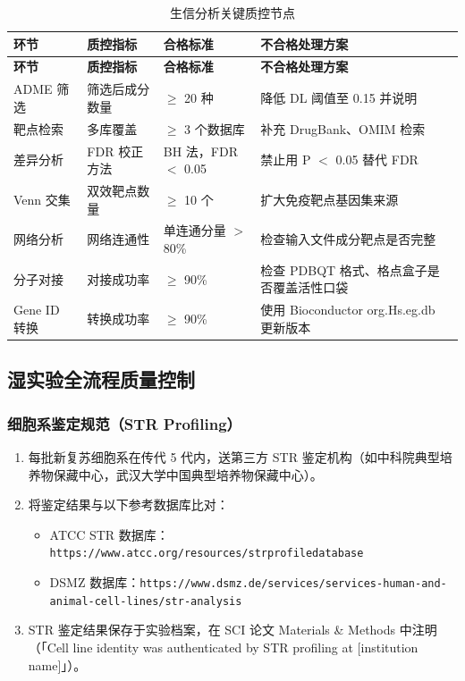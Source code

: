 \documentclass[12pt,a4paper,twoside]{article}
\begin{document}
\begin{longtable}{p{3cm}p{3.5cm}p{2.5cm}p{4.5cm}}
\caption{生信分析关键质控节点} \label{tab:bioinformatics_qc} \\
\toprule
\textbf{环节} & \textbf{质控指标} & \textbf{合格标准} & \textbf{不合格处理方案} \\
\midrule
\endfirsthead
\toprule
\textbf{环节} & \textbf{质控指标} & \textbf{合格标准} & \textbf{不合格处理方案} \\
\midrule
\endhead
\bottomrule
\endlastfoot
ADME 筛选 & 筛选后成分数量 & $\geq$ 20 种 & 降低 DL 阈值至 0.15 并说明 \\
\addlinespace
靶点检索 & 多库覆盖 & $\geq$ 3 个数据库 & 补充 DrugBank、OMIM 检索 \\
\addlinespace
差异分析 & FDR 校正方法 & BH 法，FDR $<$ 0.05 & 禁止用 P $<$ 0.05 替代 FDR \\
\addlinespace
Venn 交集 & 双效靶点数量 & $\geq$ 10 个 & 扩大免疫靶点基因集来源 \\
\addlinespace
网络分析 & 网络连通性 & 单连通分量 $>$ 80\% & 检查输入文件成分靶点是否完整 \\
\addlinespace
分子对接 & 对接成功率 & $\geq$ 90\% & 检查 PDBQT 格式、格点盒子是否覆盖活性口袋 \\
\addlinespace
Gene ID 转换 & 转换成功率 & $\geq$ 90\% & 使用 Bioconductor org.Hs.eg.db 更新版本 \\
\end{longtable}

\subsection{湿实验全流程质量控制}
\label{sec:module9_wetlab}

\subsubsection{细胞系鉴定规范（STR Profiling）}

\begin{enumerate}
  \item 每批新复苏细胞系在传代 5 代内，送第三方 STR 鉴定机构（如中科院典型培养物保藏中心，武汉大学中国典型培养物保藏中心）。
  \item 将鉴定结果与以下参考数据库比对：
    \begin{itemize}
      \item ATCC STR 数据库：\texttt{https://www.atcc.org/resources/strprofiledatabase}
      \item DSMZ 数据库：\texttt{https://www.dsmz.de/services/services-human-and-animal-cell-lines/str-analysis}
    \end{itemize}
  \item STR 鉴定结果保存于实验档案，在 SCI 论文 Materials \& Methods 中注明（「Cell line identity was authenticated by STR profiling at [institution name]」）。
\end{enumerate}
\end{document}
